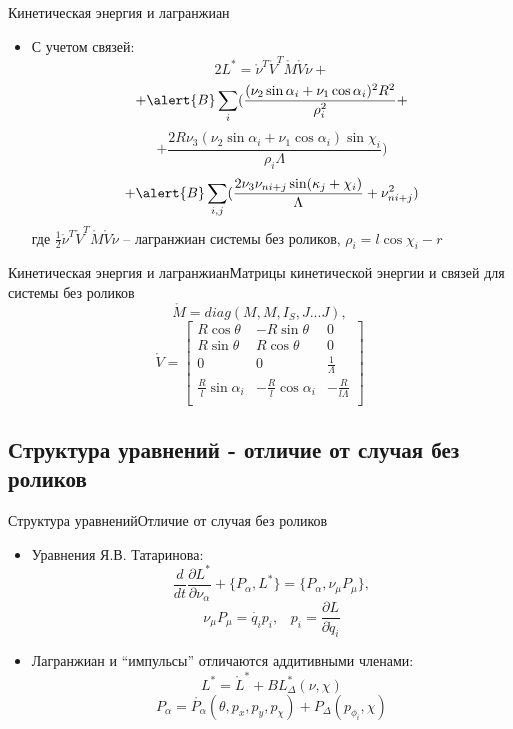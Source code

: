 \documentclass{beamer}
\begin{document}
\begin{frame}{Кинетическая энергия и лагранжиан}
  \begin{itemize}
  \item {
    С учетом связей:
    $$ 2L^{*} = \mathring{\nu}^T \mathring{V}^T \mathring{M} \mathring{V} \mathring{\nu} + $$
    $$ + \alert{B}\sum_{i}(
    	\frac{(\nu_2\sin\alpha_i+\nu_1\cos\alpha_i)^2R^2}
    	{\rho_i^2} + $$
    $$ +
    	\frac{2R\nu_3(\nu_2\sin\alpha_i+\nu_1\cos\alpha_i)\sin\chi_i}
    	{\rho_i\Lambda}
    ) $$
    $$ +
    \alert{B}\sum_{i,j}(
    	\frac{2\nu_3\nu_{ni+j}\sin(\kappa_j+\chi_i)}
    	{\Lambda}
    	+
    	\nu_{ni+j}^2
    )
    $$
    где $ \frac{1}{2}\mathring{\nu}^T \mathring{V}^T \mathring{M} \mathring{V} \mathring{\nu} $ -- лагранжиан системы без роликов, $\rho_i = l\cos\chi_i - r$
  }

  \end{itemize}
\end{frame}

\begin{frame}{Кинетическая энергия и лагранжиан}{Матрицы кинетической энергии и связей для системы без роликов}
    $$ \mathring{M} = diag(M, M, I_S, J...J), $$
    $$ \mathring{V} = \begin{bmatrix}
        R\cos\theta & -R\sin\theta & 0 \\
        R\sin\theta & R\cos\theta  & 0 \\
        0           & 0            & \frac{1}{\Lambda} \\
        \frac{R}{l}\sin\alpha_i & -\frac{R}{l}\cos\alpha_i & -\frac{R}{l\Lambda} \\
    \end{bmatrix} $$
\end{frame}

\subsection{Структура уравнений - отличие от случая без роликов}

\begin{frame}{Структура уравнений}{Отличие от случая без роликов}
  \begin{itemize}
  \item {
    Уравнения Я.В. Татаринова:
    \begin{equation}\label{Tatarinov}
    \frac{d}{dt}\frac{\partial L^{*}}{\partial \nu_\alpha}  + \{P_\alpha, L^{*}\} = \{P_\alpha, \nu_\mu P_\mu\},
    \end{equation}
    $$ \nu_\mu P_\mu = \dot{q_i} p_i, \hspace{10pt} p_i = \frac{\partial L}{\partial \dot{q}_i} $$
  }
  \item {
    Лагранжиан и ``импульсы'' отличаются аддитивными членами:
    $$ L^{*} = \mathring{L}^{*} + BL^{*}_\Delta(\nu, \chi) $$
    $$ P_\alpha = \mathring{P_\alpha}(\theta, p_x, p_y, p_\chi) + P_\Delta(p_{\phi_i}, \chi) $$
  }

  \end{itemize}
\end{frame}
\end{document}
